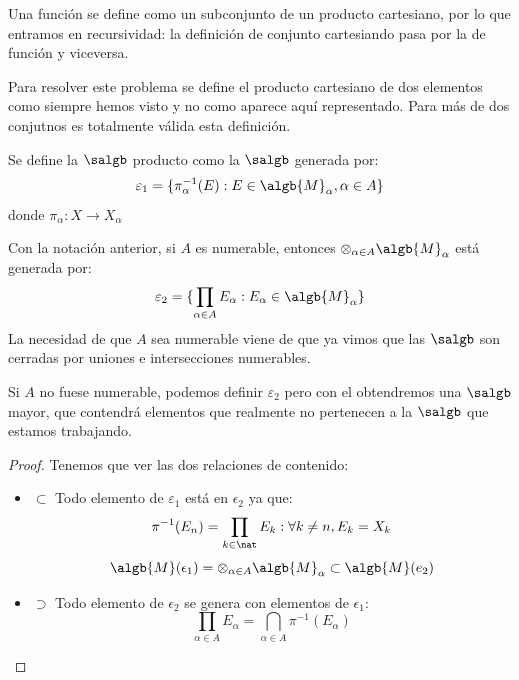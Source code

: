 \documentclass{apuntes}
\begin{document}
Una función se define como un subconjunto de un producto cartesiano, por lo que entramos en recursividad: la definición de conjunto cartesiando pasa por la de función y viceversa.

 Para resolver este problema se define el producto cartesiano de dos elementos como siempre hemos visto y no como aparece aquí representado. Para más de dos conjutnos es totalmente válida esta definición.


\begin{defn}
Se define la $\salgb$ producto como la $\salgb$ generada por:
\[\varepsilon_1 = \{\pi_\alpha^{-1}(E):E \in \algb{M}_\alpha, \alpha\in A\}\]
donde $\pi_\alpha: X \rightarrow X_\alpha$
\end{defn}

\begin{prop}
Con la notación anterior, si $A$ es numerable, entonces $\otimes_{\alpha\in A}\algb{M}_\alpha$ está generada por:
\[\varepsilon_2 = \{\prod_{\alpha\in A}E_\alpha:E_\alpha \in \algb{M}_\alpha\}\]
La necesidad de que $A$ sea numerable viene de que ya vimos que las $\salgb$ son cerradas por uniones e intersecciones numerables.

Si $A$ no fuese numerable, podemos definir $\varepsilon_2$ pero con el obtendremos una $\salgb$ mayor, que contendrá elementos que realmente no pertenecen a la $\salgb$ que estamos trabajando.
\end{prop}
\begin{proof}
Tenemos que ver las dos relaciones de contenido:
\begin{itemize}
\item $\subset$
Todo elemento de $\varepsilon_1$ está en $\epsilon_2$ ya que:
\[\pi^{-1}(E_n)=\prod_{k \in \nat}E_k : \forall k\neq n, E_k=X_k\]
\[\algb{M}(\epsilon_1)=\otimes_{\alpha \in A}\algb{M}_\alpha \subset \algb{M}(e_2)\]
\item $\supset$
Todo elemento de $\epsilon_2$ se genera con elementos de $\epsilon_1$:
\[\prod_{\alpha\in A}E_\alpha = \bigcap_{\alpha\in A} \pi^{-1}(E_\alpha)\]
\end{itemize}
\end{proof}
\end{document}
